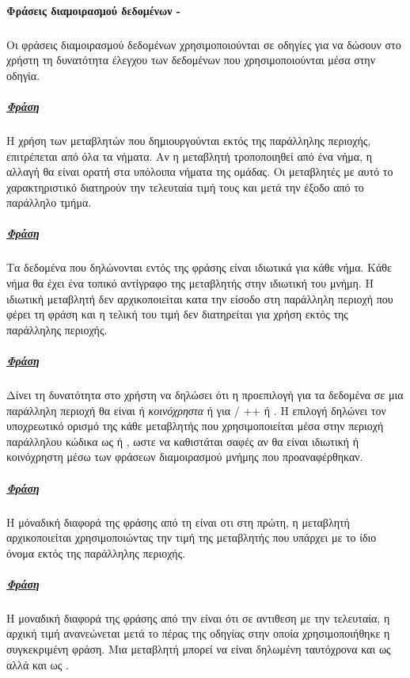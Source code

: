 \paragraph{Φράσεις διαμοιρασμού δεδομένων - }
\subparagraph{}
Οι φράσεις διαμοιρασμού δεδομένων χρησιμοποιούνται σε οδηγίες για να δώσουν στο χρήστη τη δυνατότητα έλεγχου των
δεδομένων που χρησιμοποιούνται μέσα στην οδηγία.

\subparagraph{\underline{Φράση }}
\subparagraph{}
Η χρήση των μεταβλητών που δημιουργούνται εκτός της παράλληλης περιοχής, επιτρέπεται από όλα τα νήματα. Αν η μεταβλητή
τροποποιηθεί από ένα νήμα, η αλλαγή θα είναι ορατή στα υπόλοιπα νήματα της ομάδας. Οι μεταβλητές με αυτό το
χαρακτηριστικό διατηρούν την τελευταία τιμή τους και μετά την έξοδο από το παράλληλο τμήμα.

\subparagraph{\underline{Φράση }}
\subparagraph{}
Τα δεδομένα που δηλώνονται εντός της φράσης είναι ιδιωτικά για κάθε νήμα. Κάθε νήμα θα έχει ένα τοπικό αντίγραφο της
μεταβλητής στην ιδιωτική του μνήμη. Η ιδιωτική μεταβλητή δεν αρχικοποιείται κατα την είσοδο στη παράλληλη περιοχή που
φέρει τη φράση \textbf{} και η τελική του τιμή δεν διατηρείται για χρήση εκτός της παράλληλης περιοχής.
\clearpage
\subparagraph{\underline{Φράση }}
\subparagraph{}
Δίνει τη δυνατότητα στο χρήστη να δηλώσει ότι η προεπιλογή για τα δεδομένα σε μια παράλληλη περιοχή θα είναι ή
\emph{κοινόχρηστα} ή \emph{} για  / ++ ή \emph{}. Η επιλογή \emph{}
δηλώνει τον υποχρεωτικό ορισμό της κάθε μεταβλητής που χρησιμοποιείται μέσα στην περιοχή παράλληλου κώδικα ως
 ή , ωστε να καθιστάται σαφές αν θα είναι ιδιωτική ή κοινόχρηστη μέσω των φράσεων διαμοιρασμού
μνήμης που προαναφέρθηκαν.

\subparagraph{\underline{Φράση }}
\subparagraph{}
Η μόναδική διαφορά της φράσης \emph{} από τη \emph{} είναι οτι στη πρώτη, η μεταβλητή
αρχικοποιείται χρησιμοποιώντας την τιμή της μεταβλητής που υπάρχει με το ίδιο όνομα εκτός της παράλληλης περιοχής.

\subparagraph{\underline{Φράση }}
\subparagraph{}
Η μοναδική διαφορά της φράσης \emph{} από την \emph{} είναι ότι σε αντιθεση με την
τελευταία, η αρχική τιμή ανανεώνεται μετά το πέρας της οδηγίας στην οποία χρησιμοποιήθηκε η συγκεκριμένη φράση. Μια
μεταβλητή μπορεί να είναι δηλωμένη ταυτόχρονα και ως \emph{} αλλά και ως \emph{}.

